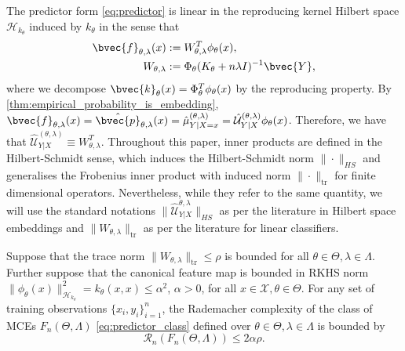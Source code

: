 \documentclass[runningheads, envcountsame, a4paper]{llncs}
\begin{document}
			The predictor form \eqref{eq:predictor} is linear in the reproducing kernel Hilbert space $\mathcal{H}_{k_{\theta}}$ induced by $k_{\theta}$ in the sense that
			\begin{equation}
			\begin{aligned}
				\bvec{f}_{\theta, \lambda}(x) &:= W_{\theta, \lambda}^{T} \phi_{\theta}(x), \\
				W_{\theta, \lambda} &:= \Phi_{\theta} (K_{\theta} + n \lambda I)^{-1} \bvec{Y},
			\end{aligned}
			\label{eq:linear_predictor}
			\end{equation}
			where we decompose $\bvec{k}_{\theta}(x) = \Phi_{\theta}^{T} \phi_{\theta}(x)$ by the reproducing property. By \cref{thm:empirical_probability_is_embedding}, $\bvec{f}_{\theta, \lambda}(x) = \hat{\bvec{p}}_{\theta, \lambda}(x) = \hat{\mu}^{(\theta, \lambda)}_{Y | X = x} = \hat{\mathcal{U}}^{(\theta, \lambda)}_{Y | X} \phi_{\theta}(x)$. Therefore, we have that $\hat{\mathcal{U}}^{(\theta, \lambda)}_{Y | X} \equiv W_{\theta, \lambda}^{T}$. Throughout this paper, inner products are defined in the Hilbert-Schmidt sense, which induces the Hilbert-Schmidt norm $\| \cdot \|_{HS}$ and generalises the Frobenius inner product with induced norm $\| \cdot \|_{\mathrm{tr}}$ for finite dimensional operators. Nevertheless, while they refer to the same quantity, we will use the standard notations $ \| \hat{\mathcal{U}}^{\theta, \lambda}_{Y | X} \|_{HS}$ as per the literature in Hilbert space embeddings and $\| W_{\theta, \lambda} \|_{\mathrm{tr}}$ as per the literature for linear classifiers.
			
			\begin{theorem}
				\label{thm:rademacher_complexity_bound}
				Suppose that the trace norm $\| W_{\theta, \lambda} \|_{\mathrm{tr}} \leq \rho$ is bounded for all $\theta \in \Theta, \lambda \in \Lambda$. Further suppose that the canonical feature map is bounded in \gls{RKHS} norm $\| \phi_{\theta}(x) \|_{\mathcal{H}_{k_{\theta}}}^{2} = k_{\theta}(x, x) \leq \alpha^{2}$, $\alpha > 0$, for all $x \in \mathcal{X}, \theta \in \Theta$. For any set of training observations $\{x_{i}, y_{i}\}_{i = 1}^{n}$, the Rademacher complexity of the class of \glspl{MCE} $F_{n}(\Theta, \Lambda)$ \eqref{eq:predictor_class} defined over $\theta \in \Theta, \lambda \in \Lambda$ is bounded by
				\begin{equation}
					\mathcal{R}_{n}(F_{n}(\Theta, \Lambda)) \leq 2 \alpha \rho.
				\label{eq:rademacher_complexity_bound}
				\end{equation}
			\end{theorem}
	
\end{document}

